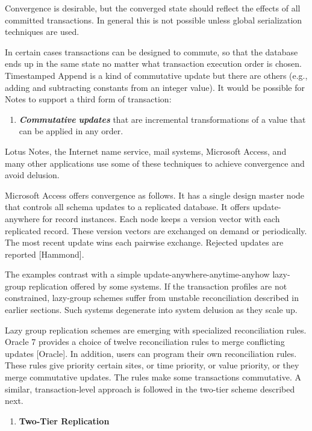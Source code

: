 \documentclass[a4paper,12pt,twoside,openright]{article}
\begin{document}
Convergence is desirable, but the converged state should reflect the
effects of all committed transactions. In general this is not possible
unless global serialization techniques are used.

In certain cases transactions can be designed to commute, so that the
database ends up in the same state no matter what transaction execution
order is chosen. Timestamped Append is a kind of commutative update but
there are others (e.g., adding and subtracting constants from an integer
value). It would be possible for Notes to support a third form of
transaction:

\begin{enumerate}
\def\labelenumi{\arabic{enumi}.}
\setcounter{enumi}{2}
\item
  \emph{\textbf{Commutative}} \emph{\textbf{updates}} that are
  incremental transformations of a value that can be applied in any
  order.
\end{enumerate}

Lotus Notes, the Internet name service, mail systems, Microsoft Access,
and many other applications use some of these techniques to achieve
convergence and avoid delusion.

Microsoft Access offers convergence as follows. It has a single design
master node that controls all schema updates to a replicated database.
It offers update-anywhere for record instances. Each node keeps a
version vector with each replicated record. These version vectors are
exchanged on demand or periodically. The most recent update wins each
pairwise exchange. Rejected updates are reported {[}Hammond{]}.

The examples contrast with a simple update-anywhere-anytime-anyhow
lazy-group replication offered by some systems. If the transaction
profiles are not constrained, lazy-group schemes suffer from unstable
reconciliation described in earlier sections. Such systems degenerate
into system delusion as they scale up.

Lazy group replication schemes are emerging with specialized
reconciliation rules. Oracle 7 provides a choice of twelve
reconciliation rules to merge conflicting updates {[}Oracle{]}. In
addition, users can program their own reconciliation rules. These rules
give priority certain sites, or time priority, or value priority, or
they merge commutative updates. The rules make some transactions
commutative. A similar, transaction-level approach is followed in the
two-tier scheme described next.

\begin{enumerate}
\def\labelenumi{\arabic{enumi}.}
\setcounter{enumi}{6}
\item
  \textbf{Two-Tier Replication }
\end{enumerate}
\end{document}
